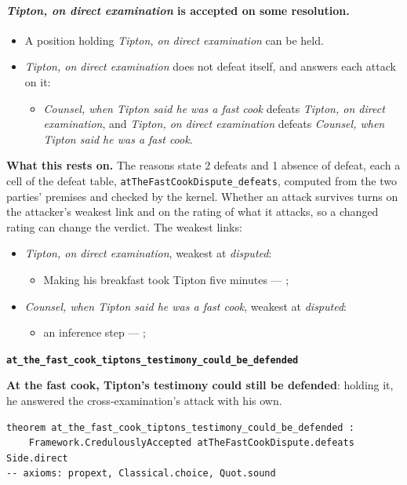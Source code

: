 \documentclass[11pt]{article}
\begin{document}
\paragraph{\emph{Tipton, on direct examination} is accepted on some resolution.}
\begin{itemize}
\item A position holding \emph{Tipton, on direct examination} can be held.
\item \emph{Tipton, on direct examination} does not defeat itself, and answers each attack on it:
\begin{itemize}
\item \emph{Counsel, when Tipton said he was a fast cook} defeats \emph{Tipton, on direct examination}, and \emph{Tipton, on direct examination} defeats \emph{Counsel, when Tipton said he was a fast cook}.
\end{itemize}
\end{itemize}
\par\noindent\textbf{What this rests on.} The reasons state 2 defeats and 1 absence of defeat, each a cell of the defeat table, \texttt{at\allowbreak{}The\allowbreak{}Fast\allowbreak{}Cook\allowbreak{}Dispute\_\allowbreak{}defeats}, computed from the two parties' premises and checked by the kernel. Whether an attack survives turns on the attacker's weakest link and on the rating of what it attacks, so a changed rating can change the verdict. The weakest links:
\begin{itemize}
\item \emph{Tipton, on direct examination}, weakest at \emph{disputed}:
\begin{itemize}
\item Making his breakfast took Tipton five minutes --- \cite[11--12]{garland-novato-healthcare-2019}; \cite{launer-my-cousin-vinny-1992}
\end{itemize}
\item \emph{Counsel, when Tipton said he was a fast cook}, weakest at \emph{disputed}:
\begin{itemize}
\item an inference step --- \cite[11--12]{garland-novato-healthcare-2019}; \cite{launer-my-cousin-vinny-1992}
\end{itemize}
\end{itemize}
\par\medskip\noindent\textbf{\texttt{at\_\allowbreak{}the\_\allowbreak{}fast\_\allowbreak{}cook\_\allowbreak{}tiptons\_\allowbreak{}testimony\_\allowbreak{}could\_\allowbreak{}be\_\allowbreak{}defended}}\par\nobreak\noindent
\textbf{At the fast cook, Tipton’s testimony could still be defended}: holding it, he answered the cross-examination’s attack with his own.

{\small\begin{verbatim}
theorem at_the_fast_cook_tiptons_testimony_could_be_defended :
    Framework.CredulouslyAccepted atTheFastCookDispute.defeats Side.direct
-- axioms: propext, Classical.choice, Quot.sound
\end{verbatim}}



\end{document}
